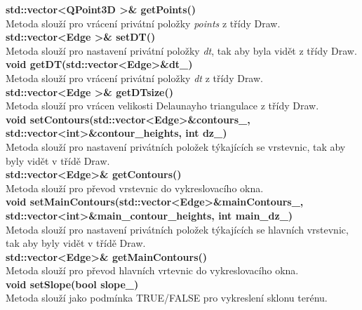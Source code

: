 \documentclass[a4paper,11pt,twoside]{article}
\begin{document}
\noindent\textbf{std::vector\textless QPoint3D \textgreater \& getPoints()}\\
Metoda slouží pro vrácení privátní položky \textit{points} z třídy Draw.\\

\noindent\textbf{std::vector\textless Edge \textgreater \& setDT()}\\
Metoda slouží pro nastavení privátní položky \textit{dt}, tak aby byla vidět z třídy Draw.\\

\noindent\textbf{void getDT(std::vector\textless Edge\textgreater \&dt\_)}\\
Metoda slouží pro vrácení privátní položky \textit{dt} z třídy Draw. \\

\noindent\textbf{std::vector\textless Edge \textgreater \& getDTsize()}\\
Metoda slouží pro vrácen velikosti Delaunayho triangulace z třídy Draw.\\

\noindent\textbf{void setContours(std::vector\textless Edge\textgreater\&contours\_, std::vector\textless int\textgreater\&contour\_heights, int dz\_)}\\
Metoda slouží pro nastavení privátních položek týkajících se vrstevnic, tak aby byly vidět v třídě Draw.\\

\noindent\textbf{std::vector\textless Edge\textgreater \& getContours()}\\
Metoda slouží pro převod vrstevnic do vykreslovacího okna.\\

\noindent\textbf{void setMainContours(std::vector\textless Edge\textgreater\&mainContours\_, std::vector\textless int\textgreater\&main\_contour\_heights, int main\_dz\_)}\\
Metoda slouží pro nastavení privátních položek týkajících se hlavních vrstevnic, tak aby byly vidět v třídě Draw.\\

\noindent\textbf{std::vector\textless Edge\textgreater \& getMainContours()}\\
Metoda slouží pro převod hlavních vrtevnic do vykreslovacího okna.\\

\noindent\textbf{void setSlope(bool slope\_)}\\
Metoda slouží jako podmínka TRUE/FALSE pro vykreslení sklonu terénu.\\
\end{document}
